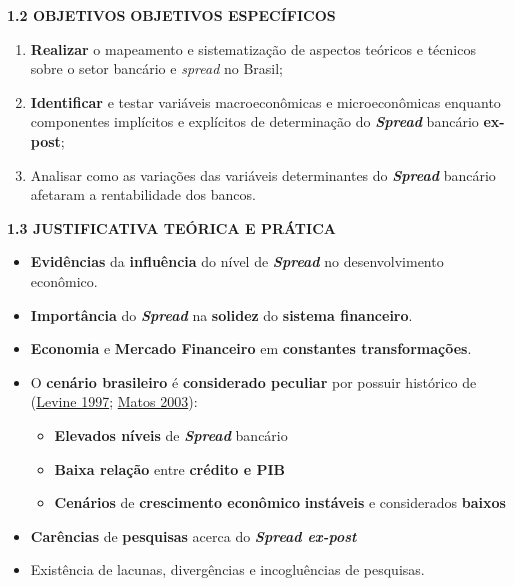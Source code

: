 \documentclass[
  ignorenonframetext,
  aspectratio=169,
  ignorenonframetext]{beamer}
\begin{document}
\begin{frame}{\textbf{1.2 OBJETIVOS}}
\protect\hypertarget{objetivos-1}{}
\textbf{OBJETIVOS ESPECÍFICOS}

\begin{enumerate}
\item
  \textbf{Realizar} o mapeamento e sistematização de aspectos teóricos e
  técnicos sobre o setor bancário e \emph{spread} no Brasil;
\item
  \textbf{Identificar} e testar variáveis macroeconômicas e
  microeconômicas enquanto componentes implícitos e explícitos de
  determinação do \textbf{\emph{Spread}} bancário \textbf{ex-post};
\item
  Analisar como as variações das variáveis determinantes do
  \textbf{\emph{Spread}} bancário afetaram a rentabilidade dos bancos.
\end{enumerate}
\end{frame}

\begin{frame}{\textbf{1.3 JUSTIFICATIVA TEÓRICA E PRÁTICA}}
\protect\hypertarget{justificativa-teuxf3rica-e-pruxe1tica}{}
\begin{itemize}
\item
  \textbf{Evidências} da \textbf{influência} do nível de
  \textbf{\emph{Spread}} no desenvolvimento econômico.
\item
  \textbf{Importância} do \textbf{\emph{Spread}} na \textbf{solidez} do
  \textbf{sistema financeiro}.
\item
  \textbf{Economia} e \textbf{Mercado Financeiro} em \textbf{constantes
  transformações}.
\item
  O \textbf{cenário brasileiro} é \textbf{considerado peculiar} por
  possuir histórico de (\protect\hyperlink{ref-levine:1997}{Levine
  1997}; \protect\hyperlink{ref-matos:2003}{Matos 2003}):

  \begin{itemize}
  \item
    \textbf{Elevados níveis} de \textbf{\emph{Spread}} bancário
  \item
    \textbf{Baixa relação} entre \textbf{crédito e PIB}
  \item
    \textbf{Cenários} de \textbf{crescimento econômico}
    \textbf{instáveis} e considerados \textbf{baixos}
  \end{itemize}
\item
  \textbf{Carências} de \textbf{pesquisas} acerca do
  \textbf{\emph{Spread ex-post}}
\item
  Existência de lacunas, divergências e incogluências de pesquisas.
\end{itemize}
\end{frame}
\end{document}
